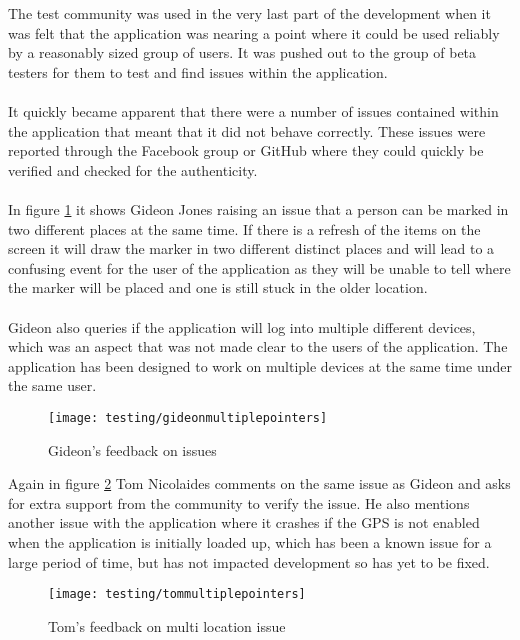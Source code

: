 \noindent
The test community was used in the very last part of the development when it was felt that the application was nearing a point where it could be used reliably by a reasonably sized group of users. It was pushed out to the group of beta testers for them to test and find issues within the application.\\
\\
It quickly became apparent that there were a number of issues contained within the application that meant that it did not behave correctly. These issues were reported through the Facebook group or GitHub where they could quickly be verified and checked for the authenticity.\\
\\
In figure \ref{fig:gideons_feedback} it shows Gideon Jones raising an issue that a person can be marked in two different places at the same time. If there is a refresh of the items on the screen it will draw the marker in two different distinct places and will lead to a confusing event for the user of the application as they will be unable to tell where the marker will be placed and one is still stuck in the older location.\\
\\
Gideon also queries if the application will log into multiple different devices, which was an aspect that was not made clear to the users of the application. The application has been designed to work on multiple devices at the same time under the same user.

\begin{figure}[H]
    \centering
    \texttt{[image: testing/gideonmultiplepointers]}
    \caption{Gideon's feedback on issues}
    \label{fig:gideons_feedback}
\end{figure} 

\noindent
Again in figure \ref{fig:toms_feedback} Tom Nicolaides comments on the same issue as Gideon and asks for extra support from the community to verify the issue. He also mentions another issue with the application where it crashes if the GPS is not enabled when the application is initially loaded up, which has been a known issue for a large period of time, but has not impacted development so has yet to be fixed.

\begin{figure}[H]
    \centering
    \texttt{[image: testing/tommultiplepointers]}
    \caption{Tom's feedback on multi location issue}
    \label{fig:toms_feedback}
\end{figure}

